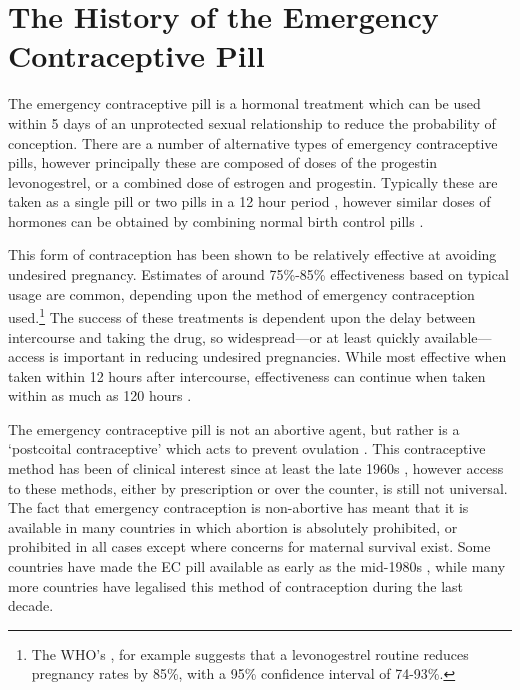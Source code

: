 \section{The History of the Emergency Contraceptive Pill}
\label{TEENscn:background}
The emergency contraceptive pill is a hormonal treatment which can be used 
within 5 days of an unprotected sexual relationship to reduce the probability
of conception.  There are a number of alternative types of emergency 
contraceptive pills, however principally these are composed of doses of the 
progestin levonogestrel, or a combined dose of estrogen and progestin. 
Typically these are taken as a single pill or two pills in a 12 hour period
\citep{vonHertzenetal2002}, however similar doses of hormones can be obtained 
by combining normal birth control pills \citep{Ellersonetal1998}.  

This form of contraception has been shown to be relatively effective at 
avoiding undesired pregnancy.  Estimates of around 75\%-85\% effectiveness 
based on typical usage are common, depending upon the method of emergency 
contraception used.\footnote{The WHO's \citet{WHO1998}, for example suggests 
that a levonogestrel routine reduces pregnancy rates by 85\%, with a 95\% 
confidence interval of 74-93\%.}  The success of these treatments is dependent
upon the delay between intercourse and taking the drug, so widespread---or at 
least quickly available---access is important in reducing undesired 
pregnancies.  While most effective when taken within 12 hours after 
intercourse, effectiveness can continue when taken within as much as 120 hours
\citep{vonHertzenetal2002}.

The emergency contraceptive pill is not an abortive agent, but rather is a 
`postcoital contraceptive' which acts to prevent ovulation 
\citep{Novikovaetal2007, Noeetal2011}. This contraceptive method has been of 
clinical interest
since at least the late 1960s \citep{Demers1971}, however access to these 
methods, either by prescription or over the counter, is still not universal.
The fact that emergency contraception is non-abortive has meant that it is
available in many countries in which abortion is absolutely prohibited, or
prohibited in all cases except where concerns for maternal survival exist.
Some countries have made the EC pill available as early as the mid-1980s 
\citep{UKFPA2006}, while many more countries have legalised this method of 
contraception during the last decade.



